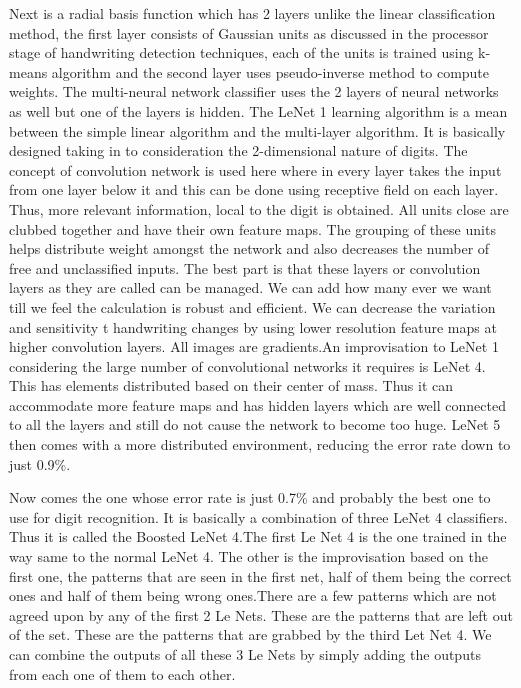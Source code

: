 \documentclass[12pt]{article}  %
\begin{document}
Next is a radial basis function which has 2 layers unlike the linear classification method, the first layer consists of Gaussian units as discussed in the processor stage of handwriting detection techniques, each of the units is trained using k-means algorithm and the second layer uses pseudo-inverse method to compute weights.  The multi-neural network classifier uses the 2 layers of neural networks as well but one of the layers is hidden.
The LeNet 1 learning algorithm is a mean between the simple linear algorithm and the multi-layer algorithm. It is basically designed taking in to consideration the 2-dimensional nature of digits. The concept of convolution network is used here where in every layer takes the input from one layer below it and this can be done using receptive field on each layer. Thus, more relevant information, local to the digit is obtained.
All units close are clubbed together and have their own feature maps. The grouping of these units helps distribute weight amongst the network and also decreases the number of free and unclassified inputs. The best part is that these layers or convolution layers as they are called can be managed. We can add how many ever we want till we feel the calculation is robust and efficient. We can decrease the variation and sensitivity t handwriting changes by using lower resolution feature maps at higher convolution layers. All images are gradients.An improvisation to LeNet 1 considering the large number of convolutional networks it requires is LeNet 4.  This has elements distributed based on their center of mass. Thus it can accommodate more feature maps and has hidden layers which are well connected to all the layers and still do not cause the network to become too huge. LeNet 5 then comes with a more distributed environment, reducing the error rate down to just 0.9\%.
 
Now comes the one whose error rate is just 0.7\% and probably the best one to use for digit recognition. It is basically a combination of three LeNet 4 classifiers. Thus it is called the Boosted LeNet 4.The first Le Net 4 is the one trained in the way same to the normal LeNet 4. The other is the improvisation based on the first one, the patterns that are seen in the first net, half of them being the correct ones and half of them being wrong ones.There are a few patterns which are not agreed upon by any of the first 2 Le Nets. These are the patterns that are left out of the set. These are the patterns that are grabbed by the third Let Net 4.  We can combine the outputs of all these 3 Le Nets by simply adding the outputs from each one of them to each other.
 
\end{document}
